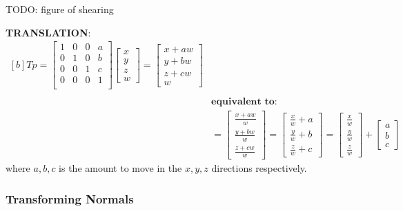 \documentclass{article}
\begin{document}
TODO: figure of shearing

\textbf{TRANSLATION}:
\begin{equation}
	\begin{aligned}[b]
	Tp = 
	\left[ \begin{matrix}
	1 & 0 & 0 & a \\
	0 & 1 & 0 & b \\
	0 & 0 & 1 & c \\
	0 & 0 & 0 & 1 \\
	\end{matrix} \right]
	\label{eq:translation}
	\left[ \begin{matrix}
		x \\ y \\ z \\ w
	\end{matrix} \right]
	=
	\left[ \begin{matrix}
		x + aw \\ y + bw \\ z + cw \\ w
	\end{matrix} \right] \\
	\\
	& \textbf{equivalent to:}
	\\
	&=
	\left[ \begin{matrix}
		\frac{x + aw}{w} \\ \frac{y + bw}{w} \\ \frac{z + cw}{w}
	\end{matrix} \right]
	=
	\left[ \begin{matrix}
		\frac{x}{w} + a \\ \frac{y}{w} + b \\ \frac{z}{w} + c
	\end{matrix} \right]
	=
	\left[ \begin{matrix}
		\frac{x}{w} \\ \frac{y}{w} \\ \frac{z}{w}
	\end{matrix} \right]
	+	
	\left[ \begin{matrix}
		a \\ b \\ c
	\end{matrix} \right]
	\end{aligned}		
\end{equation}
where $a,b,c$ is the amount to move in the $x,y,z$ directions respectively.

\subsubsection{Transforming Normals}
\end{document}

